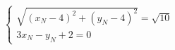 \documentclass[preview]{standalone}
\begin{document}
\begin{align*}
\begin{cases} \sqrt{(x_N - 4)^2 + (y_N - 4)^2} = \sqrt{10} \\ 3x_N - y_N + 2 = 0 \end{cases}
\end{align*}
\end{document}
